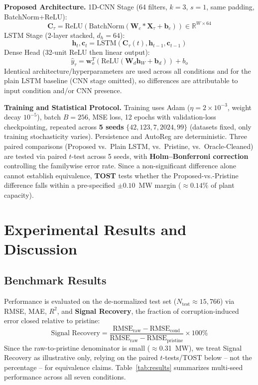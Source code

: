 \documentclass[runningheads]{llncs}
\begin{document}
\noindent\textbf{Proposed Architecture.} 1D-CNN Stage (64 filters, $k=3$, $s=1$, same padding, BatchNorm+ReLU):
\begin{equation}
\mathbf{C}_\tau=\text{ReLU}(\text{BatchNorm}(\mathbf{W}_c*\mathbf{X}_\tau+\mathbf{b}_c))\in\mathbb{R}^{W\times64}
\end{equation}
LSTM Stage (2-layer stacked, $d_h=64$):
\begin{equation}
\mathbf{h}_t,\mathbf{c}_t=\text{LSTM}(\mathbf{C}_\tau(t),\mathbf{h}_{t-1},\mathbf{c}_{t-1})
\end{equation}
Dense Head (32-unit ReLU then linear output):
\begin{equation}
\hat{y}_\tau=\mathbf{w}_o^T(\text{ReLU}(\mathbf{W}_d\mathbf{h}_W+\mathbf{b}_d))+b_o
\end{equation}
Identical architecture/hyperparameters are used across all conditions and for the plain LSTM baseline (CNN stage omitted), so differences are attributable to input condition and/or CNN presence.

\noindent\textbf{Training and Statistical Protocol.} Training uses Adam ($\eta=2\times10^{-3}$, weight decay $10^{-5}$), batch $B=256$, MSE loss, 12 epochs with validation-loss checkpointing, repeated across \textbf{5 seeds} $\{42,123,7,2024,99\}$ (datasets fixed, only training stochasticity varies). Persistence and AutoReg are deterministic. Three paired comparisons (Proposed vs.\ Plain LSTM, vs.\ Pristine, vs.\ Oracle-Cleaned) are tested via paired $t$-test across 5 seeds, with \textbf{Holm--Bonferroni correction} controlling the familywise error rate. Since a non-significant difference alone cannot establish equivalence, \textbf{TOST} tests whether the Proposed-vs.-Pristine difference falls within a pre-specified $\pm0.10$~MW margin ($\approx0.14\%$ of plant capacity).

\section{Experimental Results and Discussion}
\subsection{Benchmark Results}
Performance is evaluated on the de-normalized test set ($N_{\text{test}}\approx15{,}766$) via RMSE, MAE, $R^2$, and \textbf{Signal Recovery}, the fraction of corruption-induced error closed relative to pristine:
\begin{equation}
\text{Signal Recovery}=\frac{\text{RMSE}_{\text{raw}}-\text{RMSE}_{\text{cond}}}{\text{RMSE}_{\text{raw}}-\text{RMSE}_{\text{pristine}}}\times100\%
\label{eq:sr}
\end{equation}
Since the raw-to-pristine denominator is small ($\approx$0.31~MW), we treat Signal Recovery as illustrative only, relying on the paired $t$-tests/TOST below -- not the percentage -- for equivalence claims. Table~\ref{tab:results} summarizes multi-seed performance across all seven conditions.
\end{document}
